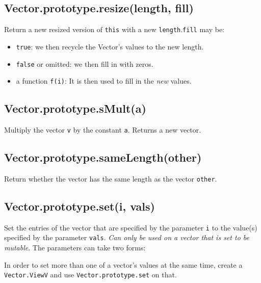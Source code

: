 \documentclass{article}
\begin{document}
    \subsection*{Vector.prototype.resize(length, fill)}
    Return a new resized version of \texttt{this} with a new \texttt{length}.\texttt{fill} may be:


\begin{itemize}

\item \texttt{true}: we then recycle the Vector's values to the new length.

\item \texttt{false} or omitted: we then fill in with zeros.

\item a function \texttt{f(i)}: It is then used to fill in the \emph{new} values.

\end{itemize}

    \subsection*{Vector.prototype.sMult(a)}
    Multiply the vector \texttt{v} by the constant \texttt{a}. Returns a new vector.


    \subsection*{Vector.prototype.sameLength(other)}
    Return whether the vector has the same length as the vector \texttt{other}.


    \subsection*{Vector.prototype.set(i, vals)}
    Set the entries of the vector that are specified by the parameter \texttt{i} to the value(s)
specified by the parameter \texttt{vals}. \emph{Can only be used on a vector that is set to
be mutable}. The parameters can take two forms:



In order to set more than one of a vector's values at the same time, create a
\texttt{Vector.ViewV} and use \texttt{Vector.prototype.set} on that.
\end{document}
